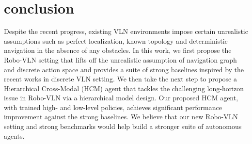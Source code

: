 \documentclass[letter, 10pt, conference]{ieeeconf}
\begin{document}
\section{conclusion} \label{sec:5}
Despite the recent progress, existing VLN environments impose certain unrealistic assumptions such as perfect localization, known topology and deterministic navigation in the absence of any obstacles. 
In this work, we first propose the Robo-VLN setting that lifts off the unrealistic assumption of navigation graph and discrete action space and provides a suite of strong baselines inspired by the recent works in discrete VLN setting. We then take the next step to propose a Hierarchical Cross-Modal (HCM) agent that tackles the challenging long-horizon issue in Robo-VLN via a hierarchical model design. Our proposed HCM agent, with trained high- and low-level policies, achieves significant performance improvement against the strong baselines. We believe that our new Robo-VLN setting and strong benchmarks would help build a stronger suite of autonomous agents.

\end{document}
